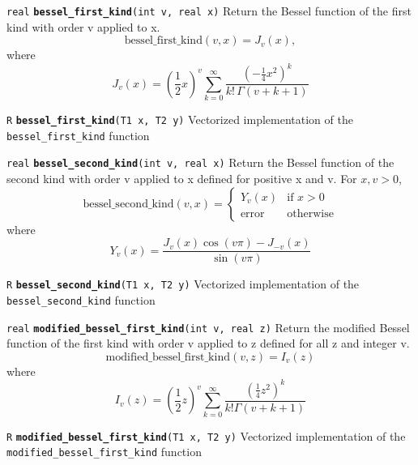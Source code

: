 \documentclass[
  10pt,
]{book}
\begin{document}
\texttt{real} \textbf{\texttt{bessel\_first\_kind}}\texttt{(int\ v,\ real\ x)}\newline
Return the Bessel function of the first kind with order v applied to
x. \[ \mathrm{bessel\_first\_kind}(v,x) = J_v(x), \] where \[
J_v(x)=\left(\frac{1}{2}x\right)^v \sum_{k=0}^\infty
\frac{\left(-\frac{1}{4}x^2\right)^k}{k!\, \Gamma(v+k+1)} \]


\texttt{R} \textbf{\texttt{bessel\_first\_kind}}\texttt{(T1\ x,\ T2\ y)}\newline
Vectorized implementation of the \texttt{bessel\_first\_kind} function


\texttt{real} \textbf{\texttt{bessel\_second\_kind}}\texttt{(int\ v,\ real\ x)}\newline
Return the Bessel function of the second kind with order v applied to
x defined for positive x and v. For \(x,v > 0\), \[
\mathrm{bessel\_second\_kind}(v,x) = \begin{cases} Y_v(x) & \text{if }
x > 0 \\ \textrm{error} & \text{otherwise} \end{cases} \] where \[
Y_v(x)=\frac{J_v(x)\cos(v\pi)-J_{-v}(x)}{\sin(v\pi)} \]


\texttt{R} \textbf{\texttt{bessel\_second\_kind}}\texttt{(T1\ x,\ T2\ y)}\newline
Vectorized implementation of the \texttt{bessel\_second\_kind} function


\texttt{real} \textbf{\texttt{modified\_bessel\_first\_kind}}\texttt{(int\ v,\ real\ z)}\newline
Return the modified Bessel function of the first kind with order v
applied to z defined for all z and integer v. \[
\mathrm{modified\_bessel\_first\_kind}(v,z) = I_v(z) \] where \[
{I_v}(z) = \left(\frac{1}{2}z\right)^v\sum_{k=0}^\infty
\frac{\left(\frac{1}{4}z^2\right)^k}{k!\Gamma(v+k+1)} \]


\texttt{R} \textbf{\texttt{modified\_bessel\_first\_kind}}\texttt{(T1\ x,\ T2\ y)}\newline
Vectorized implementation of the \texttt{modified\_bessel\_first\_kind} function
\end{document}
